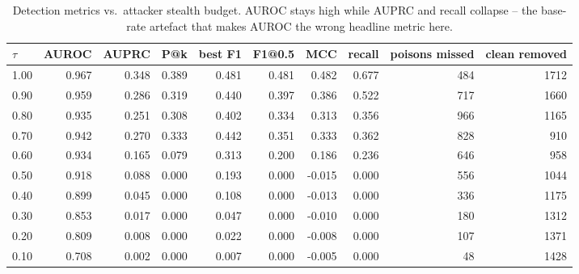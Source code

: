 \begin{table}[t]
\centering
\small
\begin{tabular}{lrrrrrrrrr}
\toprule
$\tau$ & AUROC & AUPRC & P@k & best F1 & F1@0.5 & MCC & recall & poisons missed & clean removed \\
\midrule
1.00 & 0.967 & 0.348 & 0.389 & 0.481 & 0.481 & 0.482 & 0.677 & 484 & 1712 \\
0.90 & 0.959 & 0.286 & 0.319 & 0.440 & 0.397 & 0.386 & 0.522 & 717 & 1660 \\
0.80 & 0.935 & 0.251 & 0.308 & 0.402 & 0.334 & 0.313 & 0.356 & 966 & 1165 \\
0.70 & 0.942 & 0.270 & 0.333 & 0.442 & 0.351 & 0.333 & 0.362 & 828 & 910 \\
0.60 & 0.934 & 0.165 & 0.079 & 0.313 & 0.200 & 0.186 & 0.236 & 646 & 958 \\
0.50 & 0.918 & 0.088 & 0.000 & 0.193 & 0.000 & -0.015 & 0.000 & 556 & 1044 \\
0.40 & 0.899 & 0.045 & 0.000 & 0.108 & 0.000 & -0.013 & 0.000 & 336 & 1175 \\
0.30 & 0.853 & 0.017 & 0.000 & 0.047 & 0.000 & -0.010 & 0.000 & 180 & 1312 \\
0.20 & 0.809 & 0.008 & 0.000 & 0.022 & 0.000 & -0.008 & 0.000 & 107 & 1371 \\
0.10 & 0.708 & 0.002 & 0.000 & 0.007 & 0.000 & -0.005 & 0.000 & 48 & 1428 \\
\bottomrule
\end{tabular}
\caption{Detection metrics vs.\ attacker stealth budget. AUROC stays high while AUPRC and recall collapse -- the base-rate artefact that makes AUROC the wrong headline metric here.}
\label{tab:detection}
\end{table}

